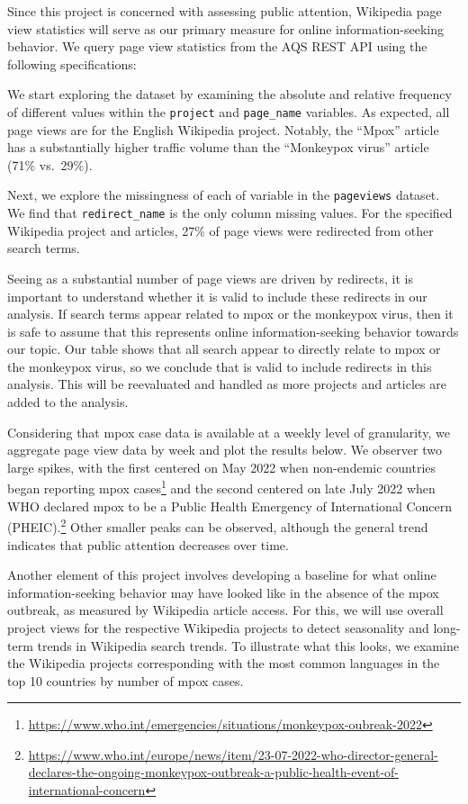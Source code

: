 \documentclass[
  12pt,
]{article}
\begin{document}
Since this project is concerned with assessing public attention,
Wikipedia page view statistics will serve as our primary measure for
online information-seeking behavior. We query page view statistics from
the AQS REST API using the following specifications:

We start exploring the dataset by examining the absolute and relative
frequency of different values within the \texttt{project} and
\texttt{page\_name} variables. As expected, all page views are for the
English Wikipedia project. Notably, the ``Mpox'' article has a
substantially higher traffic volume than the ``Monkeypox virus'' article
(71\% vs.~29\%).

Next, we explore the missingness of each of variable in the
\texttt{pageviews} dataset. We find that \texttt{redirect\_name} is the
only column missing values. For the specified Wikipedia project and
articles, 27\% of page views were redirected from other search terms.

Seeing as a substantial number of page views are driven by redirects, it
is important to understand whether it is valid to include these
redirects in our analysis. If search terms appear related to mpox or the
monkeypox virus, then it is safe to assume that this represents online
information-seeking behavior towards our topic. Our table shows that all
search appear to directly relate to mpox or the monkeypox virus, so we
conclude that is valid to include redirects in this analysis. This will
be reevaluated and handled as more projects and articles are added to
the analysis.

Considering that mpox case data is available at a weekly level of
granularity, we aggregate page view data by week and plot the results
below. We observer two large spikes, with the first centered on May 2022
when non-endemic countries began reporting mpox cases\footnote{\url{https://www.who.int/emergencies/situations/monkeypox-oubreak-2022}}
and the second centered on late July 2022 when WHO declared mpox to be a
Public Health Emergency of International Concern (PHEIC).\footnote{\url{https://www.who.int/europe/news/item/23-07-2022-who-director-general-declares-the-ongoing-monkeypox-outbreak-a-public-health-event-of-international-concern}}
Other smaller peaks can be observed, although the general trend
indicates that public attention decreases over time.

Another element of this project involves developing a baseline for what
online information-seeking behavior may have looked like in the absence
of the mpox outbreak, as measured by Wikipedia article access. For this,
we will use overall project views for the respective Wikipedia projects
to detect seasonality and long-term trends in Wikipedia search trends.
To illustrate what this looks, we examine the Wikipedia projects
corresponding with the most common languages in the top 10 countries by
number of mpox cases.
\end{document}
